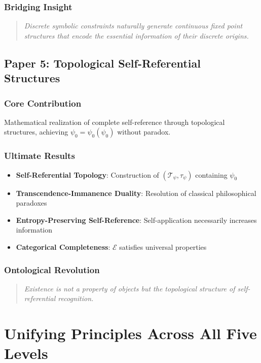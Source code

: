 \documentclass[12pt]{article}
\theoremstyle{plain}
\theoremstyle{definition}
\begin{document}
\subsubsection{Bridging Insight}
\begin{quote}
\emph{Discrete symbolic constraints naturally generate continuous fixed point structures that encode the essential information of their discrete origins.}
\end{quote}

\subsection{Paper 5: Topological Self-Referential Structures}

\subsubsection{Core Contribution}
Mathematical realization of complete self-reference through topological structures, achieving $\psi_0 = \psi_0(\psi_0)$ without paradox.

\subsubsection{Ultimate Results}
\begin{itemize}
\item \textbf{Self-Referential Topology}: Construction of $(\mathcal{T}_\psi, \tau_\psi)$ containing $\psi_0$
\item \textbf{Transcendence-Immanence Duality}: Resolution of classical philosophical paradoxes
\item \textbf{Entropy-Preserving Self-Reference}: Self-application necessarily increases information
\item \textbf{Categorical Completeness}: $\mathcal{E}$ satisfies universal properties
\end{itemize}

\subsubsection{Ontological Revolution}
\begin{quote}
\emph{Existence is not a property of objects but the topological structure of self-referential recognition.}
\end{quote}

\section{Unifying Principles Across All Five Levels}
\end{document}
